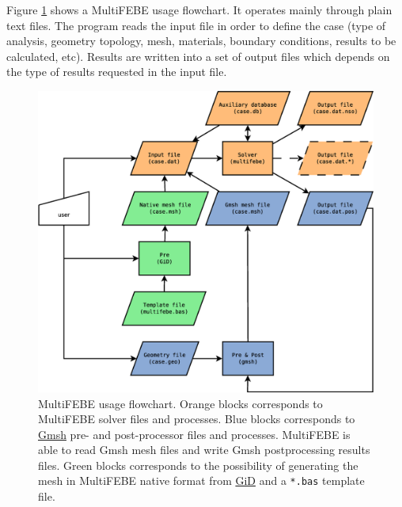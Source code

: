\documentclass[a4paper,fleqn]{book}
\begin{document}
Figure \ref{fig:flowchart} shows a MultiFEBE usage flowchart. It operates mainly through plain text files. The program reads the input file in order to define the case (type of analysis, geometry topology, mesh, materials, boundary conditions, results to be calculated, etc). Results are written into a set of output files which depends on the type of results requested in the input file. 

%
%

\begin{figure}[h]
\centering
\includegraphics[width=\textwidth]{figures/Diagrama1.eps}
\caption{MultiFEBE usage flowchart. Orange blocks corresponds to MultiFEBE solver files and processes. Blue blocks corresponds to \href{https://gmsh.info}{Gmsh} pre- and post-processor files and processes. MultiFEBE is able to read Gmsh mesh files and write Gmsh postprocessing results files. Green blocks corresponds to the possibility of generating the mesh in MultiFEBE native format from \href{https://www.gidhome.com}{GiD} and a \texttt{*.bas} template file.}
\label{fig:flowchart}
\end{figure}
\end{document}
